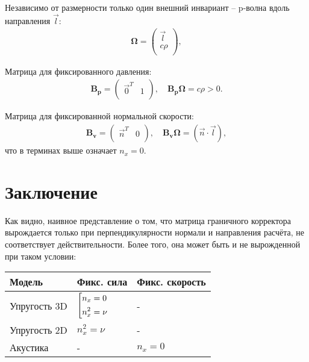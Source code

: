 Независимо от размерности только один внешний инвариант -- p-волна вдоль направления $\vec{l}$:
\begin{align}
	\mathbf{\Omega} =
	\left( \begin{array}{cccccccccccc}
	 \vec{l} \\
	 c \rho \\
	\end{array} \right),
\end{align} 

Матрица для фиксированного давления:
\begin{align}
	\mathbf{B_p} =
	\left( \begin{array}{cccccccccccc}
	 \vec{0}^T & 1 \\
	\end{array} \right), \quad
	\mathbf{B_p} \mathbf{\Omega} = c \rho > 0.
\end{align}

Матрица для фиксированной нормальной скорости:
\begin{align}
	\mathbf{B_v} =
	\left( \begin{array}{cccccccccccc}
	 \vec{n}^T & 0 \\
	\end{array} \right), \quad
	\mathbf{B_v} \mathbf{\Omega} = (\vec{n} \cdot \vec{l}),
\end{align}
что в терминах выше означает $n_x = 0$.


\section{Заключение}
Как видно, наивное представление о том, что матрица граничного корректора вырождается только при перпендикулярности нормали и направления расчёта, не соответствует действительности. Более того, она может быть и не вырожденной при таком условии:


\begin{center}
    \begin{tabular}{ | l | l | l | }
    \hline
    Модель & Фикс. сила & Фикс. скорость \\ \hline
    Упругость 3D & $\left[ \begin{gathered} n_x = 0  \hfill \\ n^2_x = \nu \hfill \\ \end{gathered} \right.$
 & - \\ \hline
    Упругость 2D & $n^2_x = \nu$ & -  \\ \hline
    Акустика & - & $n_x = 0$     \\ \hline
    \end{tabular}
\end{center}


















